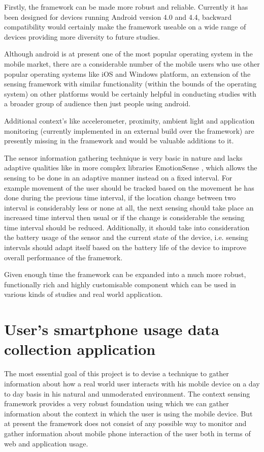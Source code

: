 \documentclass[12pt]{report}
\begin{document}
Firstly, the framework can be made more robust and reliable. Currently it has been designed for devices running Android version 4.0 and 4.4, backward compatibility would certainly make the framework useable on a wide range of devices providing more diversity to future studies. 

Although android is at present one of the most popular operating system in the mobile market, there are a considerable number of the mobile users who use other popular operating systems like iOS and Windows platform, an extension of the sensing framework with similar functionality (within the bounds of the operating system) on other platforms would be certainly helpful in conducting studies with a broader group of audience then just people using android.

Additional context's like accelerometer, proximity, ambient light and application monitoring (currently implemented in an external build over the framework) are presently missing in the framework and would be valuable additions to it.

The sensor information gathering technique is very basic in nature and lacks adaptive qualities like in more complex libraries EmotionSense \cite{rachuri2010emotionsense}, which allows the sensing to be done in an adaptive manner instead on a fixed interval. For example movement of the user should be tracked based on the movement he has done during the previous time interval, if the location change between two interval is considerably less or none at all, the next sensing should take place an increased time interval then usual or if the change is considerable the sensing time interval should be reduced. Additionally, it should take into consideration the battery usage of the sensor and the current state of the device, i.e. sensing intervals should adapt itself based on the battery life of the device to improve overall performance of the framework.

Given enough time the framework can be expanded into a much more robust, functionally rich and highly customisable component which can be used in various kinds of studies and real world application.

\chapter{User's smartphone usage data collection application}
\label{DemographicsApp}
The most essential goal of this project is to devise a technique to gather information about how a real world user interacts with his mobile device on a day to day basis in his natural and unmoderated environment. The context sensing framework provides a very robust foundation using which we can gather information about the context in which the user is using the mobile device. But at present the framework does not consist of any possible way to monitor and gather information about mobile phone interaction of the user both in terms of web and application usage.
\end{document}
